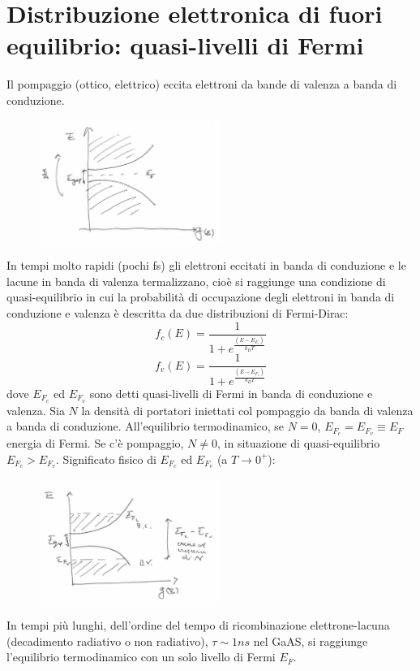 \documentclass{book}
\theoremstyle{remark}
\begin{document}
\section{Distribuzione elettronica di fuori equilibrio: quasi-livelli di Fermi}
Il pompaggio (ottico, elettrico) eccita elettroni da bande di valenza a banda di conduzione.
\begin{figure}[H]
\centering
\includegraphics[height=4cm]{images/laser_80_2}
\end{figure}
\noindent
In tempi molto rapidi (pochi fs) gli elettroni eccitati in banda di conduzione e le lacune in banda di valenza termalizzano, cioè si raggiunge una condizione di quasi-equilibrio in cui la probabilità di occupazione degli elettroni in banda di conduzione e valenza è descritta da due distribuzioni di Fermi-Dirac:
\begin{equation*}
f_c(E) = \frac{1}{1+e^\frac{(E - E_{F_c})}{k_B T}}
\end{equation*}
\begin{equation*}
f_v(E) = \frac{1}{1+e^\frac{(E - E_{F_v})}{k_B T}}
\end{equation*}
dove $E_{F_c}$ ed $E_{F_v}$ sono detti quasi-livelli di Fermi in banda di conduzione e valenza. Sia $N$ la densità di portatori iniettati col pompaggio da banda di valenza a banda di conduzione. All'equilibrio termodinamico, se $N=0$, $E_{F_c} = E_{F_v} \equiv E_F$ energia di Fermi.
Se c'è pompaggio, $N\neq 0$, in situazione di quasi-equilibrio $E_{F_c} > E_{F_v}$. Significato fisico di $E_{F_c}$ ed $E_{F_v}$ (a $T\rightarrow0^+$):
\begin{figure}[H]
\centering
\includegraphics[height=4cm]{images/laser_80_3}
\end{figure}
\noindent
In tempi più lunghi, dell'ordine del tempo di ricombinazione elettrone-lacuna (decadimento radiativo o non radiativo), $\tau \sim 1ns$ nel GaAS, si raggiunge l'equilibrio termodinamico con un solo livello di Fermi $E_F$.
\end{document}
